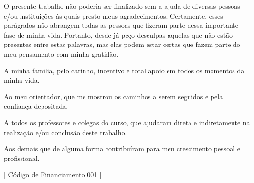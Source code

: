 \begin{Acknowledgments}%
O presente trabalho não poderia ser finalizado sem a ajuda de diversas pessoas e/ou instituições às quais presto meus agradecimentos.
Certamente, esses parágrafos não abrangem todas as pessoas que fizeram parte dessa importante fase de minha vida.
Portanto, desde já peço desculpas àquelas que não estão presentes entre estas palavras, mas elas podem estar certas que fazem parte do meu pensamento com minha gratidão.\par%
A minha família, pelo carinho, incentivo e total apoio em todos os momentos da minha vida.\par%
Ao meu orientador, que me mostrou os caminhos a serem seguidos e pela confiança depositada.\par%
A todos os professores e colegas do curso, que ajudaram direta e indiretamente na realização e/ou conclusão deste trabalho.\par%
Aos demais que de alguma forma contribuíram para meu crescimento pessoal e profissional.\par%
[%
  Código de Financiamento 001%
]
\end{Acknowledgments}
